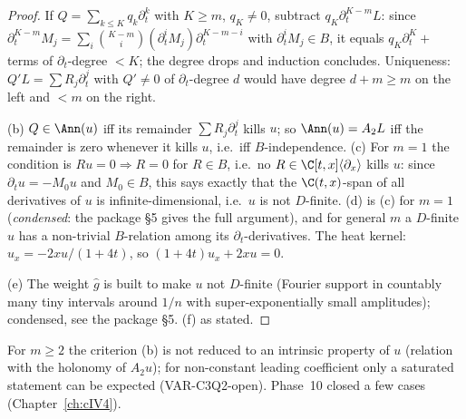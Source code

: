 \begin{proof}
If $Q=\sum_{k\le K}q_k\partial_t^k$ with $K\ge m$, $q_K\ne0$, subtract $q_K\partial_t^{K-m}L$: since $\partial_t^{K-m}M_j=\sum_i\binom{K-m}i(\partial_t^iM_j)\partial_t^{K-m-i}$ with $\partial_t^iM_j\in B$, it equals $q_K\partial_t^K+$ terms of $\partial_t$-degree $<K$; the degree drops and induction concludes. Uniqueness: $Q'L=\sum R_j\partial_t^j$ with $Q'\ne0$ of $\partial_t$-degree $d$ would have degree $d+m\ge m$ on the left and $<m$ on the right.

(b) $Q\in\Ann(u)$ iff its remainder $\sum R_j\partial_t^j$ kills $u$; so $\Ann(u)=A_2L$ iff the remainder is zero whenever it kills $u$, i.e.\ iff $B$-independence. (c) For $m=1$ the condition is $Ru=0\Rightarrow R=0$ for $R\in B$, i.e.\ no $R\in\C[t,x]\langle\partial_x\rangle$ kills $u$: since $\partial_tu=-M_0u$ and $M_0\in B$, this says exactly that the $\C(t,x)$-span of all derivatives of $u$ is infinite-dimensional, i.e.\ $u$ is not $D$-finite. (d) is (c) for $m=1$ (\emph{condensed}: the package \S5 gives the full argument), and for general $m$ a $D$-finite $u$ has a non-trivial $B$-relation among its $\partial_t$-derivatives. The heat kernel: $u_x=-2x u/(1+4t)$, so $(1+4t)u_x+2xu=0$.

(e) The weight $\hat g$ is built to make $u$ not $D$-finite (Fourier support in countably many tiny intervals around $1/n$ with super-exponentially small amplitudes); condensed, see the package \S5. (f) as stated.

\end{proof}

\begin{caution}[title=Open]
For $m\ge2$ the criterion (b) is not reduced to an intrinsic property of $u$ (relation with the holonomy of $A_2u$); for non-constant leading coefficient only a saturated statement can be expected (VAR-C3Q2-open). Phase~10 closed a few cases (Chapter~\ref{ch:cIV4}).
\end{caution}
